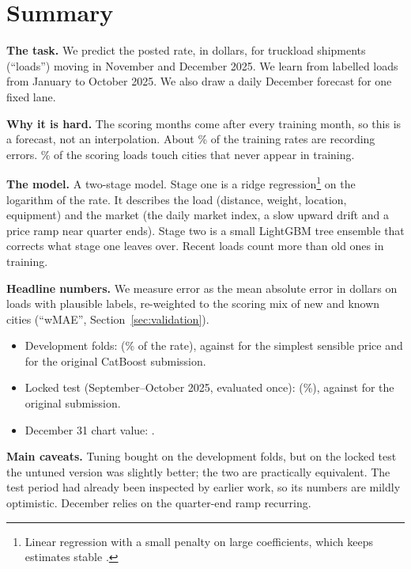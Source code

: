\section{Summary}

\textbf{The task.} We predict the posted rate, in dollars, for \NValidation{} truckload shipments (``loads'') moving
in November and December 2025. We learn from \NTrain{} labelled loads from January to October 2025. We also draw a
daily December forecast for one fixed lane.

\textbf{Why it is hard.} The scoring months come after every training month, so this is a forecast, not an
interpolation. About \CorruptPct\% of the training rates are recording errors. \UnseenShare\% of the scoring loads
touch cities that never appear in training.

\textbf{The model.} A two-stage model. Stage one is a ridge regression\footnote{Linear regression with a small
penalty on large coefficients, which keeps estimates stable \citep{hoerl1970ridge}.} on the logarithm of the rate.
It describes the load (distance, weight, location, equipment) and the market (the daily market index, a slow upward
drift and a price ramp near quarter ends). Stage two is a small LightGBM tree ensemble \citep{ke2017lightgbm} that
corrects what stage one leaves over. Recent loads count more than old ones in training.

\textbf{Headline numbers.} We measure error as the mean absolute error in dollars on loads with plausible labels,
re-weighted to the scoring mix of new and known cities (``wMAE'', Section~\ref{sec:validation}).
\begin{itemize}
  \item Development folds: \usd{\DevStepF} (\MapeDevStepF\% of the rate), against \usd{\DevStepA} for the simplest
        sensible price and \usd{\DevStepB} for the original CatBoost submission.
  \item Locked test (September--October 2025, evaluated once): \usd{\TestFinalTuned} (\MapeTestFinal\%), against
        \usd{\TestCatboostRawDollars} for the original submission.
  \item December 31 chart value: \usd{\DecLast}.
\end{itemize}

\textbf{Main caveats.} Tuning bought \usd{\DevTunedGain} on the development folds, but on the locked test the
untuned version was slightly better; the two are practically equivalent. The test period had already been
inspected by earlier work, so its numbers are mildly optimistic. December relies on the quarter-end ramp recurring.
